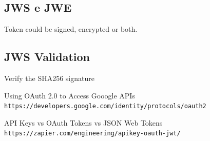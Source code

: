 \documentclass[20pt]{style}
\begin{document}
\subsection{JWS e JWE}
Token could be signed, encrypted or both.

\subsection{JWS Validation}
Verify the SHA256 signature

\begin{thebibliography}{9}
    Using OAuth 2.0 to Access Gooogle APIs
    \\
    \texttt{https://developers.google.com/identity/protocols/oauth2}

    API Keys vs OAuth Tokens vs JSON Web Tokens
    \\
    \texttt{https://zapier.com/engineering/apikey-oauth-jwt/}

\end{thebibliography}

\newpage
\end{document}
